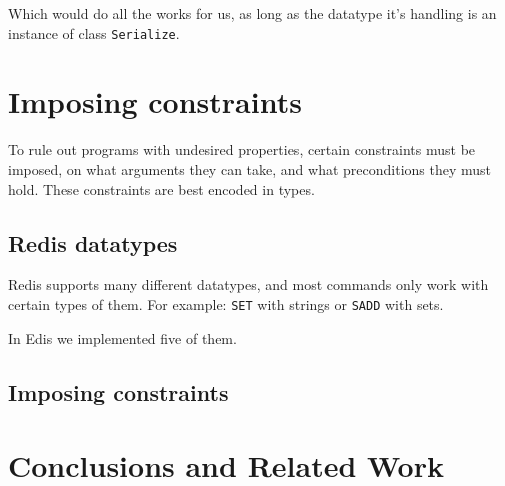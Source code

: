 \documentclass[pldi]{sigplanconf-pldi16}
\begin{document}
Which would do all the works for us, as long as the datatype it's handling is
an instance of class \texttt{Serialize}.\footnotemark


\section{Imposing constraints}

To rule out programs with undesired properties, certain constraints must be
imposed, on what arguments they can take, and what preconditions they must hold.
These constraints are best encoded in types.

\subsection{Redis datatypes}

Redis supports many different datatypes, and most commands only work with
certain types of them. For example: \texttt{SET} with strings or
\texttt{SADD} with sets.



In Edis we implemented five of them.



\subsection{Imposing constraints}


\section{Conclusions and Related Work}




\end{document}
